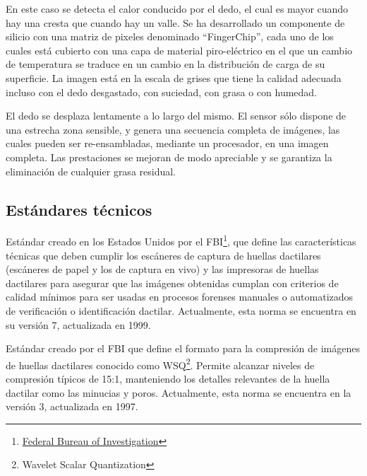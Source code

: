 \documentclass[../principal]{subfiles}
\begin{document}
\begin{description}[align=left]
    \item[Térmicos:] En este caso se detecta el calor conducido por el dedo, el cual es mayor cuando hay una cresta que cuando hay un valle. Se ha desarrollado un componente de silicio con una matriz de pixeles denominado ``FingerChip'', cada uno de los cuales está cubierto con una capa de material piro-eléctrico en el que un cambio de temperatura se traduce en un cambio en la distribución de carga de su superficie. La imagen está en la escala de grises que tiene la calidad adecuada incluso con el dedo desgastado, con suciedad, con grasa o con humedad.\cite{web:sensor_huella_digital}
    \item[De salida dinámica:] El dedo se desplaza lentamente a lo largo del mismo. El sensor sólo dispone de una estrecha zona sensible, y genera una secuencia completa de imágenes, las cuales pueden ser re-ensambladas, mediante un procesador, en una imagen completa. Las prestaciones se mejoran de modo apreciable y se garantiza la eliminación de cualquier grasa residual.\cite{web:sensor_digital}
  \end{description}

  \subsection{Estándares técnicos}

  \begin{description}[align=left]
    \item[CJIS-RS-0010:] Estándar creado en los Estados Unidos por el FBI\footnote{\href{https://www.fbi.gov/}{Federal Bureau of Investigation}}, que define las características técnicas que deben cumplir los escáneres de captura de huellas dactilares (escáneres de papel y los de captura en vivo) y las impresoras de huellas dactilares para asegurar que las imágenes obtenidas cumplan con criterios de calidad mínimos para ser usadas en procesos forenses manuales o automatizados de verificación o identificación dactilar. Actualmente, esta norma se encuentra en su versión 7, actualizada en 1999.\cite{web:huella_dactilar}
    \item[IAFIS-IC-0110:] Estándar creado por el FBI que define el formato para la compresión de imágenes de huellas dactilares conocido como WSQ\footnote{Wavelet Scalar Quantization}. Permite alcanzar niveles de compresión típicos de 15:1, manteniendo los detalles relevantes de la huella dactilar como las minucias y poros. Actualmente, esta norma se encuentra en la versión 3, actualizada en 1997.\cite{articulo:identificacion_forense_comunidades_bacterias}
  \end{description}
\end{document}
